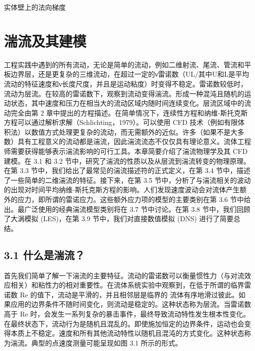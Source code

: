 \documentclass[11pt,a4paper,openany,fontset=none]{ctexbook}
\begin{document}
实体壁上的法向梯度

\chapter{湍流及其建模}

工程实践中遇到的所有流动，无论是简单的流动，例如二维射流、尾流、管流和平板边界层，还是更复杂的三维流动，在超过一定的ν雷诺数（UL/其中U和L是平均流动的特征速度和ν长度尺度，并且是运动粘度）时变得不稳定。雷诺数较低时，流动为层流。在较高的雷诺数下，观察到流动变得湍流。形成一种混沌且随机的运动状态，其中速度和压力在相当大的流动区域内随时间连续变化。层流区域中的流动完全由第 2 章中提出的方程描述。在简单情况下，连续性方程和纳维-斯托克斯方程可以通过解析求解（Schlichting，1979）。可以使用 CFD 技术（例如有限体积法）以数值方式处理更复杂的流动，而无需额外的近似。许多（如果不是大多数）具有工程意义的流动都是湍流，因此湍流流态不仅仅具有理论意义。流体工程师需要获得能够表示湍流影响的可行工具。本章简要介绍了湍流物理学及其 CFD 建模。在 3.1 和 3.2 节中，研究了湍流的性质以及从层流到湍流转变的物理原理。在第 3.3 节中，我们给出了最常见的湍流描述符的正式定义，在第 3.4 节中，描述了一些简单的二维湍流的特征。接下来，在第 3.5 节中，分析了与湍流相关的波动的出现对时间平均纳维-斯托克斯方程的影响。人们发现速度波动会对流体产生额外的应力，即所谓的雷诺应力。这些额外应力项的模型的主要类别在第 3.6 节中给出。最广泛使用的经典湍流模型类别将在 3.7 节中讨论。在第 3.8 节中，我们回顾了大涡模拟 (LES)，在第 3.9 节中，我们对直接数值模拟 (DNS) 进行了简要总结。

\section*{3.1 什么是湍流？}

首先我们简单了解一下湍流的主要特征。流动的雷诺数可以衡量惯性力（与对流效应相关）和粘性力的相对重要性。在流体系统实验中观察到，在低于所谓的临界雷诺数 Re 的值下，流动是平滑的，并且相邻层是临界的
流体有序地滑过彼此。如果应用的边界条件不随时间变化，则流动是稳定的。这种状态称为层流。当雷诺数高于 Re 时，会发生一系列复杂的暴击事件，最终导致流动特性发生根本性变化。在最终状态下，流动行为是随机且混乱的。即使施加恒定的边界条件，运动也会变得本质上不稳定。速度和所有其他流动特性以随机且混沌的方式变化。这种状态称为湍流。典型的点速度测量可能呈现如图 3.1 所示的形式。
\end{document}
